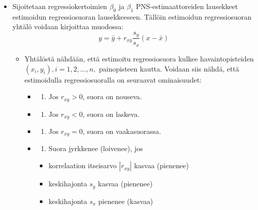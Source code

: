 \documentclass[
]{book}
\providecommand{\tightlist}{%
  \setlength{\itemsep}{0pt}\setlength{\parskip}{0pt}}
\begin{document}
\begin{itemize}
\item
  Sijoitetaan regressiokertoimien \(\beta_0\) ja \(\beta_1\) PNS-estimaattoreiden lausekkeet estimoidun regressiosuoran lausekkeeseen. Tällöin estimoidun regressiosuoran yhtälö voidaan kirjoittaa muodossa:
  \[
  y = \bar{y} + r_{xy} \frac{s_y}{s_x} (x-\bar{x})
  \]

  \begin{itemize}
  \tightlist
  \item
    Yhtälöstä nähdään, että estimoitu regressiosuora kulkee havaintopisteiden \((x_i , y_i), i = 1,2, \ldots, n,\) painopisteen kautta. Voidaan siis nähdä, että estimoidulla regressiosuoralla on seuraavat ominaisuudet:

    \begin{itemize}
    \item
      \begin{enumerate}
      \def\labelenumi{(\roman{enumi})}
      \tightlist
      \item
        Jos \(r_{xy} > 0\), suora on nouseva.
      \end{enumerate}
    \item
      \begin{enumerate}
      \def\labelenumi{(\roman{enumi})}
      \setcounter{enumi}{1}
      \tightlist
      \item
        Jos \(r_{xy} < 0\), suora on laskeva.
      \end{enumerate}
    \item
      \begin{enumerate}
      \def\labelenumi{(\roman{enumi})}
      \setcounter{enumi}{2}
      \tightlist
      \item
        Jos \(r_{xy} = 0\), suora on vaakasuorassa.
      \end{enumerate}
    \item
      \begin{enumerate}
      \def\labelenumi{(\roman{enumi})}
      \setcounter{enumi}{3}
      \tightlist
      \item
        Suora jyrkkenee (loivenee), jos
      \end{enumerate}

      \begin{itemize}
      \tightlist
      \item
        korrelaation itseisarvo \(|r_{xy}|\) kasvaa (pienenee)
      \item
        keskihajonta \(s_y\) kasvaa (pienenee)
      \item
        keskihajonta \(s_x\) pienenee (kasvaa)
      \end{itemize}
    \end{itemize}
  \end{itemize}
\end{itemize}
\end{document}
